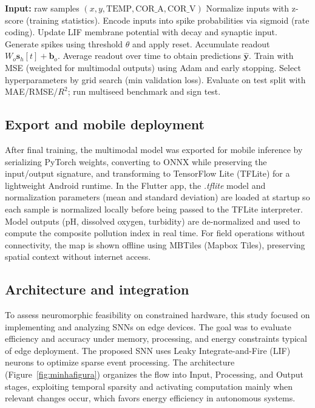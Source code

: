 \begin{algorithm}[H]
\caption{Modeling, training, and evaluation pipeline.}
\label{alg:snn_pipeline}
\begin{algorithmic}[1]
\STATE \textbf{Input:} raw samples $(x,y,\mathrm{TEMP},\mathrm{COR\_A},\mathrm{COR\_V})$
\STATE Normalize inputs with z-score (training statistics).
\STATE Encode inputs into spike probabilities via sigmoid (rate coding).
\STATE Update LIF membrane potential with decay and synaptic input.
\STATE Generate spikes using threshold $\theta$ and apply reset.
\STATE Accumulate readout $W_o \mathbf{s}_h[t] + \mathbf{b}_o$.
\ENDFOR
\STATE Average readout over time to obtain predictions $\hat{\mathbf{y}}$.
\STATE Train with MSE (weighted for multimodal outputs) using Adam and early stopping.
\STATE Select hyperparameters by grid search (min validation loss).
\STATE Evaluate on test split with MAE/RMSE/$R^2$; run multiseed benchmark and sign test.
\end{algorithmic}
\end{algorithm}

\subsection{Export and mobile deployment}
After final training, the multimodal model was exported for mobile inference by serializing PyTorch
weights, converting to ONNX while preserving the input/output signature, and transforming to TensorFlow
Lite (TFLite) for a lightweight Android runtime. In the Flutter app, the \textit{.tflite} model and
normalization parameters (mean and standard deviation) are loaded at startup so each sample is normalized
locally before being passed to the TFLite interpreter. Model outputs (pH, dissolved oxygen, turbidity)
are de-normalized and used to compute the composite pollution index in real time. For field operations
without connectivity, the map is shown offline using MBTiles (Mapbox Tiles), preserving spatial context
without internet access.

\subsection{Architecture and integration}
To assess neuromorphic feasibility on constrained hardware, this study focused on implementing and
analyzing SNNs on edge devices. The goal was to evaluate efficiency and accuracy under memory,
processing, and energy constraints typical of edge deployment. The proposed SNN uses Leaky Integrate-and-Fire
(LIF) neurons to optimize sparse event processing. The architecture (Figure~\ref{fig:minhafigura}) organizes
the flow into Input, Processing, and Output stages, exploiting temporal sparsity and activating computation
mainly when relevant changes occur, which favors energy efficiency in autonomous systems.

